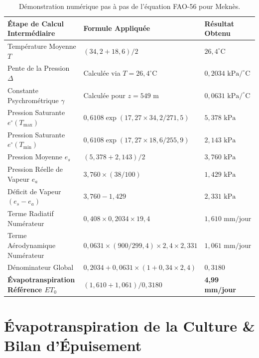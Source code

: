 \documentclass[11pt,a4paper,oneside]{report}
\begin{document}
\begin{table}[h!]
\centering
\small
\begin{tabularx}{0.88\linewidth}{lXl}
\toprule
\textbf{Étape de Calcul Intermédiaire} & \textbf{Formule Appliquée} & \textbf{Résultat Obtenu} \\
\midrule
Température Moyenne $T$ & $(34,2 + 18,6) / 2$ & $26,4^\circ\text{C}$ \\
Pente de la Pression $\Delta$ & Calculée via $T=26,4^\circ\text{C}$ & $0,2034\text{ kPa/}^\circ\text{C}$ \\
Constante Psychrométrique $\gamma$ & Calculée pour $z=549\text{ m}$ & $0,0631\text{ kPa/}^\circ\text{C}$ \\
Pression Saturante $e^\circ(T_{\max})$ & $0,6108 \exp(17,27 \times 34,2 / 271,5)$ & $5,378\text{ kPa}$ \\
Pression Saturante $e^\circ(T_{\min})$ & $0,6108 \exp(17,27 \times 18,6 / 255,9)$ & $2,143\text{ kPa}$ \\
Pression Moyenne $e_s$ & $(5,378 + 2,143) / 2$ & $3,760\text{ kPa}$ \\
Pression Réelle de Vapeur $e_a$ & $3,760 \times (38 / 100)$ & $1,429\text{ kPa}$ \\
Déficit de Vapeur $(e_s - e_a)$ & $3,760 - 1,429$ & $2,331\text{ kPa}$ \\
Terme Radiatif Numérateur & $0,408 \times 0,2034 \times 19,4$ & $1,610\text{ mm/jour}$ \\
Terme Aérodynamique Numérateur & $0,0631 \times (900/299,4) \times 2,4 \times 2,331$ & $1,061\text{ mm/jour}$ \\
Dénominateur Global & $0,2034 + 0,0631 \times (1 + 0,34 \times 2,4)$ & $0,3180$ \\
\midrule
\textbf{Évapotranspiration Référence $ET_0$} & $(1,610 + 1,061) / 0,3180$ & \textbf{4,99 mm/jour} \\
\bottomrule
\end{tabularx}
\caption{Démonstration numérique pas à pas de l'équation FAO-56 pour Meknès.}
\label{tab:fao56_demo_fr}
\end{table}

\chapter{Évapotranspiration de la Culture \& Bilan d'Épuisement}
\end{document}
